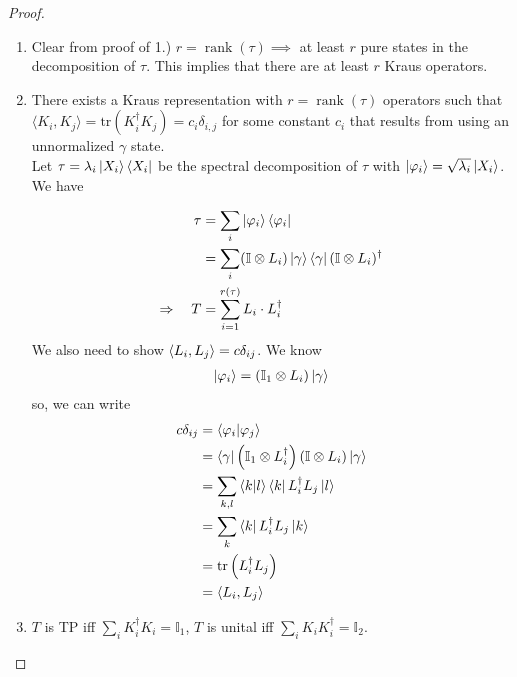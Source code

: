 \documentclass[10pt,oneside,longbibliography]{report}
\DeclareMathOperator{\rank}{rank}
\begin{document}
\begin{tcolorbox}[colframe=black,breakable, colback=black!5, arc=0pt, outer arc=0pt,boxrule=0.5pt]
\begin{proof}
\begin{enumerate}
    
    
    \item Clear from proof of 1.) $r=\rank(\tau) \implies$ at least $r$ pure states in the decomposition of $\tau$. This implies that there are at least $r$ Kraus operators. 
    \item There exists a Kraus representation with $r=\rank(\tau)$ operators such that $\langle K_i,K_j\rangle=\text{tr}(K_i^{\dagger} K_j) = c_i \delta_{i,j}$ for some constant $c_i$ that results from using an unnormalized $\gamma$ state. \\
    
    Let $\tau = \lambda_i \ket{X_i} \bra{X_i}$ be the spectral decomposition of $\tau$ with $\ket{\varphi_i}=\sqrt{\lambda_i} \ket{X_i}$. We have
    
    \begin{align}
        \tau &= \sum_i \ket{\varphi_i}\bra{\varphi_i} \\
        &=\sum_i (\mathbb{I} \otimes L_i) \ket{\gamma}\bra{\gamma} (\mathbb{I}\otimes L_i)^{\dagger} \\
        \Rightarrow \quad  T &= \sum_{i=1}^{r(\tau)}L_i \cdot L_i^{\dagger}
    \end{align}
    We also need to show $\braket{L_i,L_j}=c \delta_{ij}$. We know
    \begin{align}
       \ket{\varphi_i} = (\mathbb{I}_1 \otimes L_i)\ket{\gamma}
    \end{align}
    so, we can write
    \begin{align}
      c\delta_{ij} &=\braket{\varphi_i|\varphi_j}\\
      &= \bra{\gamma}\left(\mathbb{I}_1 \otimes L_i^{\dagger}\right)\left(\mathbb{I}\otimes L_i\right)\ket{\gamma} \\
        &= \sum_{k,l} \braket{k|l} \bra{k}L_i^{\dagger} L_j \ket{l}\\
        &= \sum_k  \bra{k} L_i^{\dagger}L_j \ket{k} \\
        &= \text{tr}\left(L_i^{\dagger} L_j\right)\\
        &= \braket{L_i,L_j}
    \end{align}
    
    \item $T$ is TP iff $\sum_i K_i^{\dagger}K_i = \mathbb{I}_1$, $T$ is unital iff $\sum_i K_i K_i^{\dagger} = \mathbb{I}_2$.
    

\end{enumerate}
\end{proof}
\end{tcolorbox}
\end{document}
